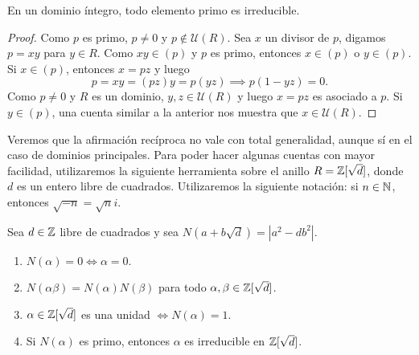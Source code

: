 \begin{proposition}
En un dominio íntegro, todo elemento primo es irreducible.  
\end{proposition}

\begin{proof}
Como $p$ es primo, $p\ne 0$ y $p\not\in\mathcal{U}(R)$. Sea $x$ un divisor de $p$, digamos $p=xy$ para $y\in R$. Como $xy\in(p)$ y $p$ es primo,
entonces $x\in(p)$ o $y\in(p)$. Si $x\in(p)$, entonces $x=pz$ y luego 
\[
p=xy=(pz)y=p(yz)\implies p(1-yz)=0.
\]
Como $p\ne 0$ y $R$ es un dominio, $y,z\in\mathcal{U}(R)$ y luego $x=pz$ es asociado a $p$. Si $y\in(p)$, una cuenta similar a la anterior nos muestra
que $x\in\mathcal{U}(R)$.
\end{proof}

Veremos que la afirmación recíproca no vale con total generalidad, aunque sí en el caso de dominios principales. Para poder hacer algunas
cuentas con mayor facilidad, utilizaremos la siguiente herramienta sobre el anillo $R=\mathbb{Z}[\sqrt{d}]$, donde $d$ es un entero 
libre de cuadrados. Utilizaremos la siguiente notación: si $n\in\mathbb{N}$, entonces $\sqrt{-n}=\sqrt{n}i$. 

\begin{lemma}
Sea $d\in\mathbb{Z}$ libre de cuadrados y sea $N(a+b\sqrt{d})=|a^2-db^2|$. 
\begin{enumerate}
\item $N(\alpha)=0\Longleftrightarrow \alpha=0$.
\item $N(\alpha\beta)=N(\alpha)N(\beta)$ para todo $\alpha,\beta\in\mathbb{Z}[\sqrt{d}]$. 
\item $\alpha\in\mathbb{Z}[\sqrt{d}]$ es una unidad $\Longleftrightarrow N(\alpha)=1$.
\item Si $N(\alpha)$ es primo, entonces $\alpha$ es irreducible en $\mathbb{Z}[\sqrt{d}]$.  	
\end{enumerate}
\end{lemma}

